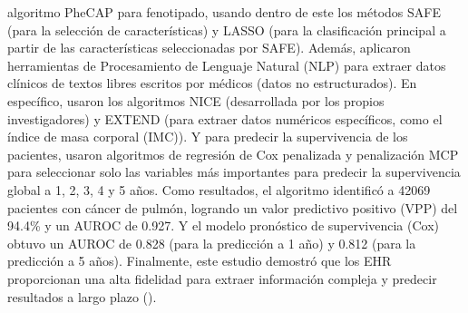 \begin{itemize}
    algoritmo PheCAP para fenotipado, usando dentro de este los métodos SAFE (para la selección de características) y LASSO (para la clasificación principal a partir de las características seleccionadas por SAFE). Además, aplicaron herramientas de Procesamiento de Lenguaje Natural (NLP) para extraer datos clínicos de textos libres escritos por médicos (datos no estructurados). En específico, usaron los algoritmos NICE (desarrollada por los propios investigadores) y EXTEND (para extraer datos numéricos específicos, como el índice de masa corporal (IMC)). Y para predecir la supervivencia de los pacientes, usaron algoritmos de regresión de Cox penalizada y penalización MCP para seleccionar solo las variables más importantes para predecir la supervivencia global a 1, 2, 3, 4 y 5 años. Como resultados, el algoritmo identificó a 42069 pacientes con cáncer de pulmón, logrando un valor predictivo positivo (VPP) del 94.4\% y un AUROC de 0.927. Y el modelo pronóstico de supervivencia (Cox) obtuvo un AUROC de 0.828 (para la predicción a 1 año) y 0.812 (para la predicción a 5 años). Finalmente, este estudio demostró que los EHR proporcionan una alta fidelidad para extraer información compleja y predecir resultados a largo plazo (\cite{article9}).


\end{itemize}

